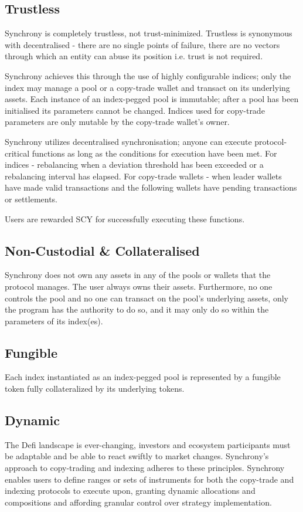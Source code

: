 \documentclass[10pt]{article}
\begin{document}
					\subsection{Trustless}
					Synchrony is completely trustless, not trust-minimized. Trustless is synonymous
					with decentralised - there are no single points of failure, there are no vectors
					through which an entity can abuse its position i.e. trust is not required. \par
					Synchrony achieves this through the use of highly configurable indices; only
					the index may manage a pool or a copy-trade wallet and transact on its
					underlying assets. Each instance of an index-pegged pool is immutable; after
					a pool has been initialised its parameters cannot be changed. Indices used for
					copy-trade parameters are only mutable by the copy-trade wallet's owner.\par
					Synchrony utilizes decentralised synchronisation; anyone can execute
					protocol-critical functions as long as the conditions for execution have been
					met. For indices - rebalancing when a deviation threshold has been exceeded or
					a rebalancing interval has elapsed. For copy-trade wallets - when leader wallets
					have made valid transactions and the following wallets have pending transactions
					or settlements. \par
					Users are rewarded SCY for successfully executing these functions.
					\subsection{Non-Custodial \& Collateralised}
					Synchrony does not own any assets in any of the pools or wallets that the
					protocol manages. The user always owns their assets. Furthermore, no one
					controls the pool and no one can transact on the pool's underlying assets, only
					the program has the authority to do so, and it may only do so within the
					parameters of its index(es).
					\subsection{Fungible}
					Each index instantiated as an index-pegged pool is represented by a fungible
					token fully collateralized by its underlying tokens.
					\subsection{Dynamic}
					The Defi landscape is ever-changing, investors and ecosystem participants must
					be adaptable and be able to react swiftly to market changes. Synchrony's
					approach to copy-trading and indexing adheres to these principles. Synchrony
					enables users to define ranges or sets of instruments for both the copy-trade
					and indexing protocols to execute upon, granting dynamic allocations and
					compositions and affording granular control over strategy implementation.
\end{document}
